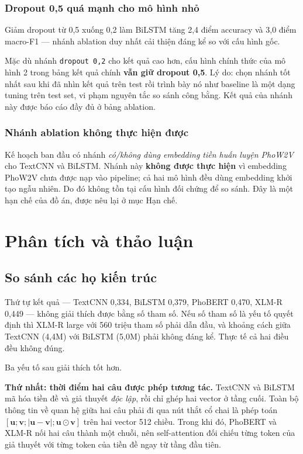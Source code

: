 \documentclass[12pt,a4paper,oneside]{report}
\begin{document}
\subsection{Dropout 0,5 quá mạnh cho mô hình nhỏ}

Giảm dropout từ 0,5 xuống 0,2 làm BiLSTM tăng 2,4 điểm accuracy và 3,0 điểm macro-F1 ---
nhánh ablation duy nhất cải thiện đáng kể so với cấu hình gốc.

\begin{notebox}
Mặc dù nhánh \texttt{dropout 0,2} cho kết quả cao hơn, cấu hình chính thức của mô hình 2
trong bảng kết quả chính \textbf{vẫn giữ dropout 0,5}. Lý do: chọn nhánh tốt nhất sau khi
đã nhìn kết quả trên test rồi trình bày nó như baseline là một dạng tuning trên test set,
vi phạm nguyên tắc so sánh công bằng. Kết quả của nhánh này được báo cáo đầy đủ ở bảng
ablation.
\end{notebox}

\subsection{Nhánh ablation không thực hiện được}

Kế hoạch ban đầu có nhánh \textit{có/không dùng embedding tiền huấn luyện PhoW2V} cho
TextCNN và BiLSTM. Nhánh này \textbf{không được thực hiện} vì embedding PhoW2V chưa được
nạp vào pipeline; cả hai mô hình đều dùng embedding khởi tạo ngẫu nhiên. Do đó không tồn
tại cấu hình đối chứng để so sánh. Đây là một hạn chế của đồ án, được nêu lại ở mục Hạn
chế.

\chapter{Phân tích và thảo luận}

\section{So sánh các họ kiến trúc}

Thứ tự kết quả --- TextCNN 0,334, BiLSTM 0,379, PhoBERT 0,470, XLM-R 0,449 --- không giải
thích được bằng số tham số. Nếu số tham số là yếu tố quyết định thì XLM-R large với 560
triệu tham số phải dẫn đầu, và khoảng cách giữa TextCNN (4,4M) với BiLSTM (5,0M) phải
không đáng kể. Thực tế cả hai điều đều không đúng.

Ba yếu tố sau giải thích tốt hơn.

\textbf{Thứ nhất: thời điểm hai câu được phép tương tác.} TextCNN và BiLSTM mã hóa tiền đề
và giả thuyết \textit{độc lập}, rồi chỉ ghép hai vector ở tầng cuối. Toàn bộ thông tin về
quan hệ giữa hai câu phải đi qua nút thắt cổ chai là phép toán
$[\mathbf{u};\mathbf{v};|\mathbf{u}-\mathbf{v}|;\mathbf{u}\odot\mathbf{v}]$ trên hai vector
512 chiều. Trong khi đó, PhoBERT và XLM-R nối hai câu thành một chuỗi, nên self-attention
đối chiếu từng token của giả thuyết với từng token của tiền đề ngay từ tầng đầu tiên.
\end{document}
